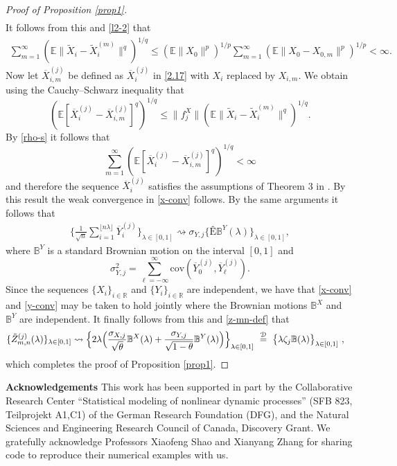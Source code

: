 \documentclass[11pt]{article}
\numberwithin{equation}{section}
\numberwithin{theorem}{section}
\numberwithin{lemma}{section}
\numberwithin{proposition}{section}
\numberwithin{cor}{section}
\numberwithin{definition}{section}
\numberwithin{cons}{section}
\numberwithin{rem}{section}
\numberwithin{exa}{section}
\numberwithin{table}{section}
\numberwithin{figure}{section}
\numberwithin{algo}{section}
\begin{document}
{{\begin{proof}[Proof of Proposition \ref{prop1}]
\begin{align*}
\end{align*}
It follows from this and \eqref{l2-2} that
\begin{align}\label{rho-s}
\sum_{m=1}^\infty (\mathbb{E}\|\tilde X_i - \tilde X_i^{(m)}\|^q)^{1/q} \le (\mathbb{E}\|X_0\|^{p})^{1/p} \sum_{m=1}^\infty (\mathbb{E}\|X_0-X_{0,m}\|^{p})^{1/p} < \infty.
\end{align}
Now let $\overline {X}_{i,m}^{(j)}$ be defined as $\overline {X}_{i}^{(j)}$ in \eqref{2.17} with $X_i$ replaced by $X_{i,m}$. We obtain using the Cauchy--Schwarz inequality that
$$
(\mathbb{E} [\overline {X}_{i}^{(j)}- \overline {X}_{i,m}^{(j)}]^q)^{1/q}  \le \|f^X_j\| (\mathbb{E}\|\tilde X_i - \tilde X_i^{(m)}  \|^q)^{1/q}.
$$
By \eqref{rho-s} it follows that
$$
\sum_{m=1}^{\infty}(\mathbb{E} [\overline {X}_{i}^{(j)}- \overline {X}_{i,m}^{(j)}]^q)^{1/q} < \infty
$$
and therefore the sequence $\overline {X}_{i}^{(j)}$ satisfies the assumptions of Theorem 3 in
 \cite{wu:2005}. By this result the weak convergence in \eqref{x-conv} follows. By the same arguments it follows that
\begin{align}\label{y-conv}
\Big \{ \frac {1}{\sqrt{n}} \sum_{i=1}^{\lfloor n \lambda \rfloor} \overline{Y}_i^{(j)} \Big \}_{\lambda \in [0,1]}
 \rightsquigarrow \sigma_{Y,j} \{Ê\mathbb{B}^Y(\lambda)\}_{\lambda \in [0,1]},
\end{align}
where $\mathbb{B}^Y$ is a standard Brownian motion on the interval $[0,1]$ and
$$
\sigma_{Y,j}^2 = \sum_{\ell = -\infty}^{\infty} \mbox{cov}(\overline{Y}_0^{(j)},\overline{Y}_\ell^{(j)}).
$$
Since the   sequences $\{ X_i \}_{i \in \mathbb{R}}$ and $\{ Y_i \}_{i \in \mathbb{R}}$ are independent, we have that \eqref{x-conv} and \eqref{y-conv} may be taken to hold jointly where the Brownian motions $\mathbb{B}^X$ and $\mathbb{B}^Y$ are independent.
It finally follows from this and \eqref{z-mn-def} that
\begin{align*}
\{ \tilde Z^{(j)}_{m,n} (\lambda)\}_{\lambda \in [0,1]} &\rightsquigarrow \Big \{ 2 \lambda \Big ( \frac {\sigma_{X,j}}{\sqrt{\theta}} \mathbb{B}^X (\lambda) + \frac {\sigma_{Y,j}}{\sqrt{1 - \theta}} \mathbb{B}^Y (\lambda)\Big ) \Big \}_{\lambda \in [0,1]}~ \stackrel{\cal D}{=} ~\big \{ \lambda\zeta_j \mathbb{B}(\lambda)  \big \}_{\lambda \in [0,1]}~,
\end{align*}
which completes the proof of Proposition \ref{prop1}.
\end{proof}



\bigskip
{\bf  Acknowledgements} This work has been supported in part by the
Collaborative Research Center ``Statistical modeling of nonlinear
dynamic processes'' (SFB 823, Teilprojekt A1,C1) of the German Research Foundation
(DFG), and the Natural Sciences and Engineering Research Council of Canada, Discovery Grant. We gratefully acknowledge Professors Xiaofeng Shao and Xianyang Zhang for sharing code to reproduce their numerical examples with us.

}}
\end{document}
